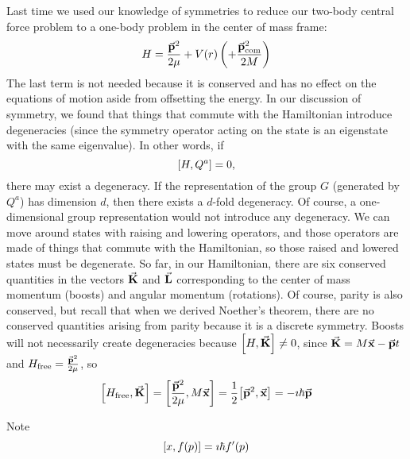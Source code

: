 \documentclass[a4paper,twoside,master.tex]{subfiles}
\begin{document}

Last time we used our knowledge of symmetries to reduce our two-body central force problem to a one-body problem in the center of mass frame:
\begin{equation}
    H = \frac{\va{p}^2}{2 \mu} + V(r) \left( + \frac{\va{p}^2_{\text{com}}}{2M} \right)
\end{equation}
The last term is not needed because it is conserved and has no effect on the equations of motion aside from offsetting the energy. In our discussion of symmetry, we found that things that commute with the Hamiltonian introduce degeneracies (since the symmetry operator acting on the state is an eigenstate with the same eigenvalue). In other words, if
\begin{equation}
    \comm{H}{Q^a} = 0,
\end{equation}
there may exist a degeneracy. If the representation of the group $ G $ (generated by $ Q^a $) has dimension $ d $, then there exists a $ d $-fold degeneracy. Of course, a one-dimensional group representation would not introduce any degeneracy. We can move around states with raising and lowering operators, and those operators are made of things that commute with the Hamiltonian, so those raised and lowered states must be degenerate. So far, in our Hamiltonian, there are six conserved quantities in the vectors $ \va{K} $ and $ \va{L} $ corresponding to the center of mass momentum (boosts) and angular momentum (rotations). Of course, parity is also conserved, but recall that when we derived Noether's theorem, there are no conserved quantities arising from parity because it is a discrete symmetry. Boosts will not necessarily create degeneracies because $ \comm{H}{\va{K}} \neq 0 $, since $ \va{K} = M \va{x} - \va{p} t $ and $ H_{\text{free}} = \frac{\va{p}^2}{2 \mu} $, so
\begin{equation}
    \comm{H_{\text{free}}}{\va{K}} = \comm{\frac{\va{p}^2}{2 \mu}}{M \va{x}} = \frac{1}{2} \comm{\va{p}^2}{\va{x}} = - \imath \hbar \va{p}
\end{equation}

\begin{note}{Note}
    \begin{equation}
        \comm{x}{f(p)} = \imath \hbar f'(p)
    \end{equation}
\end{note}
\end{document}
